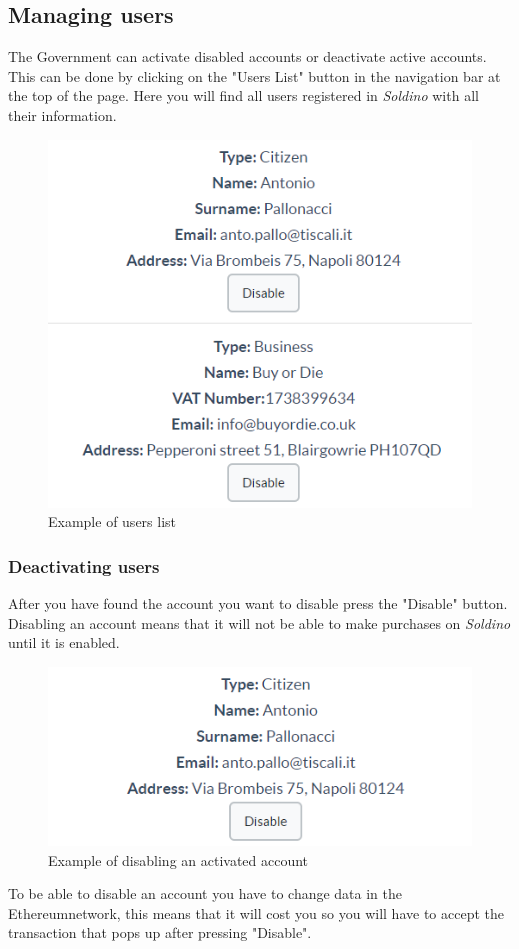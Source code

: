 	\subsection{Managing users}
	The Government can activate disabled accounts or deactivate active accounts.
	This can be done by clicking on the "Users List" button in the navigation
	bar at the top of the page. Here you will find all users registered in 
	\textit{Soldino} with all their information.
	\begin{figure}[H]
		\includegraphics[width=15cm]{res/images/users_list.png}
		\centering
		\caption{Example of users list}
	\end{figure}
		\subsubsection{Deactivating users}
		After you have found the account you want to disable press the 
		"Disable" button. Disabling an account means that it will not be able to make purchases on \textit{Soldino} 
		until it is enabled.
		\begin{figure}[H]
			\includegraphics[width=13cm]{res/images/users_disable.png}
			\centering
			\caption{Example of disabling an activated account}
		\end{figure}
		\noindent To be able to disable an account you have to change 
		data in the Ethereum\glosp network, this means that it will 
		cost you so you will have to accept the transaction that pops
		up after pressing "Disable".
